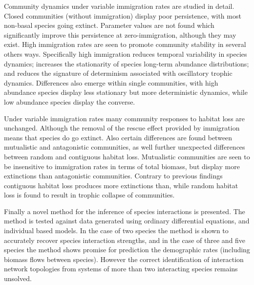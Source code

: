 \begin{SingleSpace}
Community dynamics under variable immigration rates are studied in detail. Closed communities (without immigration) display poor persistence, with most non-basal species going extinct. Parameter values are not found which significantly improve this persistence at zero-immigration, although they may exist. High immigration rates are seen to promote community stability in several others ways. Specifically high immigration reduces temporal variability in species dynamics; increases the stationarity of species long-term abundance distributions; and reduces the signature of determinism associated with oscillatory trophic dynamics. Differences also emerge within single communities, with high abundance species display less stationary but more deterministic dynamics, while low abundance species display the converse. 

Under variable immigration rates many community responses to habitat loss are unchanged. Although the removal of the rescue effect provided by immigration means that species do go extinct. Also certain differences are found between mutualistic and antagonistic communities, as well further unexpected differences between random and contiguous habitat loss. Mutualistic communities are seen to be insensitive to immigration rates in terms of total biomass, but display more extinctions than antagonistic communities. Contrary to previous findings contiguous habitat loss produces more extinctions than, while random habitat loss is found to result in trophic collapse of communities. 

Finally a novel method for the inference of species interactions is presented. The method is tested against data generated using ordinary differential equations, and individual based models. In the case of two species the method is shown to accurately recover species interaction strengths, and in the case of three and five species the method shows promise for prediction the demographic rates (including biomass flows between species). However the correct identification of interaction network topologies from systems of more than two interacting species remains unsolved.   

 

\end{SingleSpace}
\clearpage